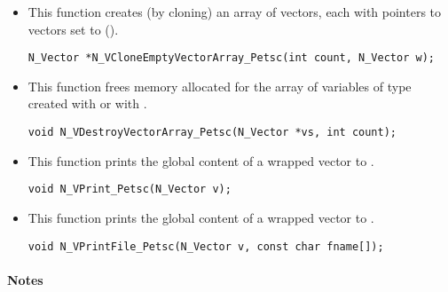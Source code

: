 \begin{itemize}

\item {}
 
  This function creates (by cloning) an array of  {\nvecpetsc} vectors,
  each with pointers to {\petsc} vectors set to ().
 
\begin{verbatim}
N_Vector *N_VCloneEmptyVectorArray_Petsc(int count, N_Vector w);
\end{verbatim}


\item {}
 
 This function frees memory allocated for the array of  variables of
 type  created with  or with
 .
 

 \verb|void N_VDestroyVectorArray_Petsc(N_Vector *vs, int count);|



\item {}
  
  This function prints the global content of a wrapped {\petsc} vector to .
    
  \verb|void N_VPrint_Petsc(N_Vector v);|


\item {}
  
  This function prints the global content of a wrapped {\petsc} vector to .

  \verb|void N_VPrintFile_Petsc(N_Vector v, const char fname[]);|

\end{itemize}
\paragraph{\bf Notes} 
           
